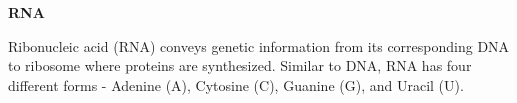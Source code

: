 \question \textbf{RNA}
  
Ribonucleic acid (RNA) conveys genetic information from its corresponding DNA to ribosome where proteins are synthesized. Similar to DNA, RNA has four different forms - Adenine (A), Cytosine (C), Guanine (G), and Uracil (U).

\vspace{0.1 in}


